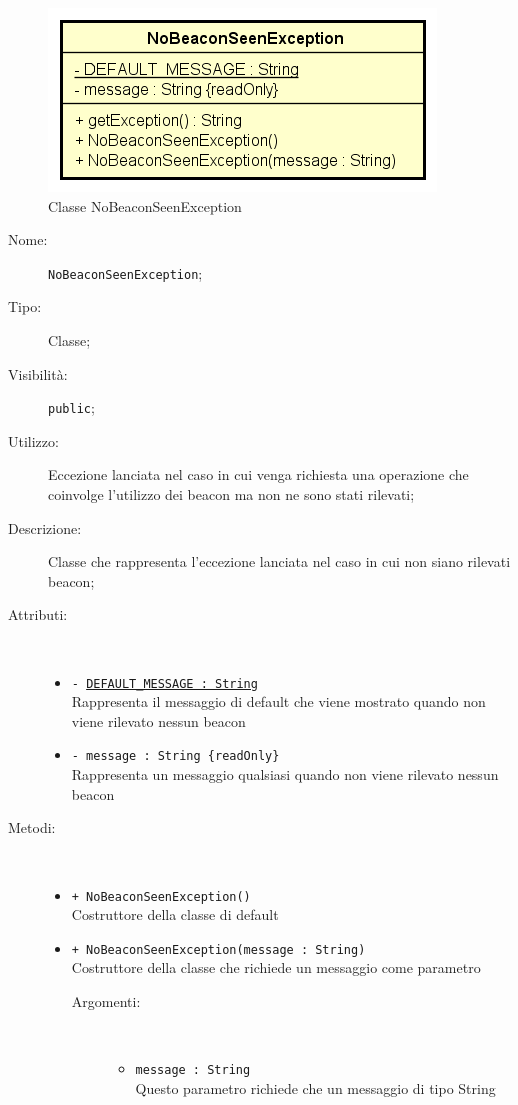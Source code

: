 \documentclass[../DefinizioneDiProdotto.tex]{subfiles}
\begin{document}
    \begin{figure}[H]
        \centering
        \includegraphics{img/NoBeaconSeenException.png}
        \caption{Classe NoBeaconSeenException}\label{fig:model::NoBeaconSeenException} 
    \end{figure}
    \begin{description}
\item[Nome:] \texttt{NoBeaconSeenException};
\item[Tipo:] Classe;
\item[Visibilità:] \texttt{public};
\item[Utilizzo:] Eccezione lanciata nel caso in cui venga richiesta una operazione che coinvolge l'utilizzo dei beacon ma non ne sono stati rilevati;
\item[Descrizione:] Classe che rappresenta l'eccezione lanciata nel caso in cui non siano rilevati beacon;
\item[Attributi:] \
\begin{itemize}
\item \texttt{- \underline{DEFAULT\_MESSAGE : String}}\\
Rappresenta il messaggio di default che viene mostrato quando non viene rilevato nessun beacon

\item \texttt{- message : String \{readOnly\}}\\
Rappresenta un messaggio qualsiasi quando non viene rilevato nessun beacon

\end{itemize}
\item[Metodi:] \
\begin{itemize}
\item \texttt{+ NoBeaconSeenException()}\\
Costruttore della classe di default
 \item \texttt{+ NoBeaconSeenException(message : String)}\\
Costruttore della classe che richiede un messaggio come parametro
 \begin{description}
\item[Argomenti:] \
\begin{itemize}
\item \texttt{message : String}\\
Questo parametro richiede che un messaggio di tipo  String\end{itemize}
\end{description}
\end{itemize}
\end{description}
\end{document}

